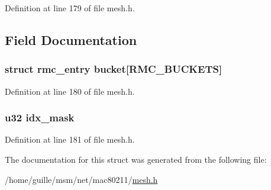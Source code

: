 Definition at line 179 of file mesh.\-h.



\subsection{Field Documentation}
\hypertarget{structmesh__rmc_a65c3b74ae0afdff4662c4079c8bde59f}{
\subsubsection[{bucket}]{\setlength{\rightskip}{0pt plus 5cm}struct {\bf rmc\-\_\-entry} bucket\mbox{[}{\bf R\-M\-C\-\_\-\-B\-U\-C\-K\-E\-T\-S}\mbox{]}}}\label{structmesh__rmc_a65c3b74ae0afdff4662c4079c8bde59f}


Definition at line 180 of file mesh.\-h.

\hypertarget{structmesh__rmc_ae4f16a108310e98c6a5a222966147624}{
\subsubsection[{idx\-\_\-mask}]{\setlength{\rightskip}{0pt plus 5cm}u32 idx\-\_\-mask}}\label{structmesh__rmc_ae4f16a108310e98c6a5a222966147624}


Definition at line 181 of file mesh.\-h.



The documentation for this struct was generated from the following file\-:\begin{DoxyCompactItemize}
\item 
/home/guille/msm/net/mac80211/\hyperlink{mesh_8h}{mesh.\-h}\end{DoxyCompactItemize}
